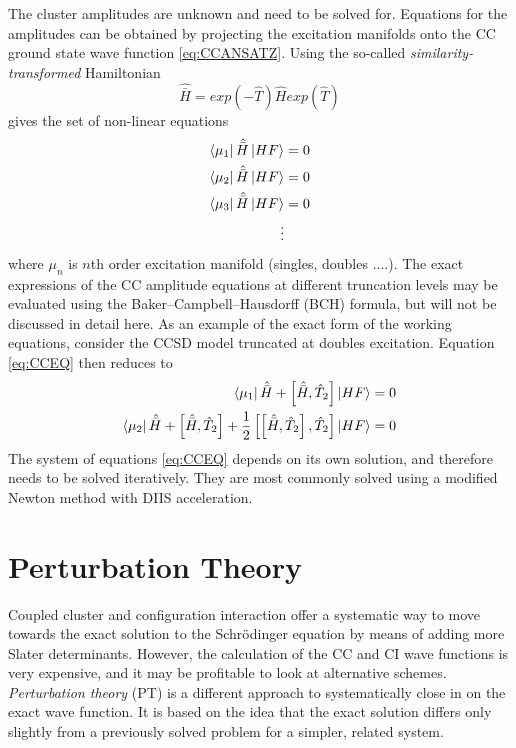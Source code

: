 The cluster amplitudes are unknown and need to be solved for. Equations for the amplitudes can be obtained by projecting the excitation manifolds onto the CC ground state wave function \ref{eq:CCANSATZ}. Using the so-called \emph{similarity-transformed} Hamiltonian
\begin{equation}
\hat{\bar{H}} = exp(-\hat{T}) \hat{H} exp(\hat{T})
\end{equation} 
\noindent gives the set of non-linear equations
\begin{align}
\bra{\mu_1}\hat{\bar{H}}\ket{HF} &= 0 \\
\bra{\mu_2}\hat{\bar{H}}\ket{HF} &= 0 \\
\bra{\mu_3}\hat{\bar{H}}\ket{HF} &= 0 \\
\vdots
\label{eq:CCEQ}
\end{align}
\noindent where $\mu_n$ is $n$th order excitation manifold (singles, doubles ....). The exact expressions of the CC amplitude equations at different truncation levels may be evaluated using the 
Baker–Campbell–Hausdorff (BCH) formula, but will not be discussed in detail here. As an example of the exact form of the working equations, consider the CCSD model truncated at doubles excitation. Equation \ref{eq:CCEQ} then reduces to
\begin{align}
\bra{\smash{\mu_1}} \hat{\bar{H}} + \left[\hat{\bar{H}},\hat{T}_2\right] \ket{\smash{HF}} = 0 
\label{eq:CCSDEQSINGLES}
\\
\bra{\smash{\mu_2}} \hat{\bar{H}} + \left[\hat{\bar{H}},\hat{T}_2\right] + \frac{1}{2} \left[ \left[ \hat{\bar{H}},\hat{T}_2\right],\hat{T}_2\right] \ket{\smash{HF}} = 0
\label{eq:CCSDEQDOUBLES}
\end{align}
The system of equations \ref{eq:CCEQ} depends on its own solution, and therefore needs to be solved iteratively. They are most commonly solved using a modified Newton method with DIIS acceleration. 

\section{Perturbation Theory}

Coupled cluster and configuration interaction offer a systematic way to move towards the exact solution to the Schrödinger equation by means of adding more Slater determinants. However, the calculation of the  CC and CI wave functions is very expensive, and it may be profitable to look at alternative schemes. \emph{Perturbation theory} (PT) is a different approach to systematically close in on the exact wave function. It is based on the idea that the exact solution differs only slightly from a previously solved problem for a simpler, related system.

